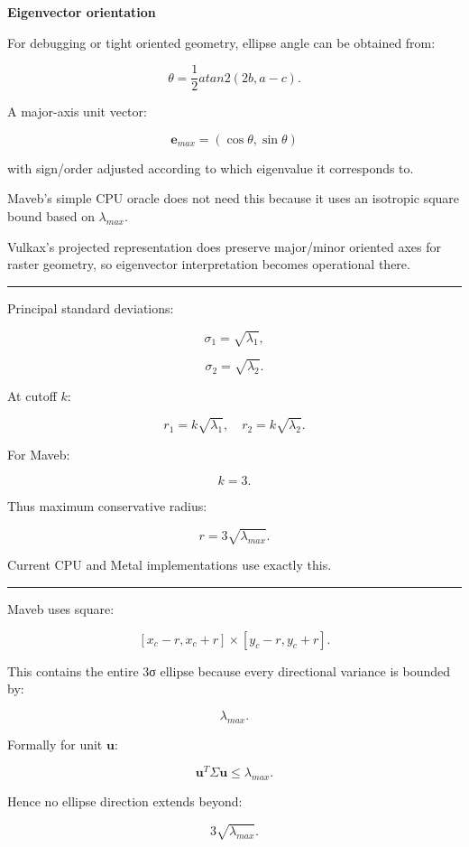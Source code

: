 \textbf{Eigenvector orientation}

For debugging or tight oriented geometry, ellipse angle can be obtained from:

\[
\boxed{
\theta=
\frac12
atan2(
2b,
a-c
).
}
\]

A major-axis unit vector:

\[
\mathbf e_{max}
=
(\cos\theta,\sin\theta)
\]

with sign/order adjusted according to which eigenvalue it corresponds to.

Maveb's simple CPU oracle does not need this because it uses an isotropic square bound based on \(\lambda_{max}\).

Vulkax's projected representation does preserve major/minor oriented axes for raster geometry, so eigenvector interpretation becomes operational there.

\begin{center}\rule{0.5\linewidth}{0.5pt}\end{center}

Principal standard deviations:

\[
\sigma_1=
\sqrt{\lambda_1},
\]

\[
\sigma_2=
\sqrt{\lambda_2}.
\]

At cutoff \(k\):

\[
\boxed{
r_1=
k\sqrt{\lambda_1},
\quad
r_2=
k\sqrt{\lambda_2}.
}
\]

For Maveb:

\[
k=3.
\]

Thus maximum conservative radius:

\[
\boxed{
r=
3\sqrt{\lambda_{max}}.
}
\]

Current CPU and Metal implementations use exactly this.

\begin{center}\rule{0.5\linewidth}{0.5pt}\end{center}

Maveb uses square:

\[
[x_c-r,x_c+r]
\times
[y_c-r,y_c+r].
\]

This contains the entire 3σ ellipse because every directional variance is bounded by:

\[
\lambda_{max}.
\]

Formally for unit \(\mathbf u\):

\[
\mathbf u^T
\Sigma
\mathbf u
\le
\lambda_{max}.
\]

Hence no ellipse direction extends beyond:

\[
3\sqrt{\lambda_{max}}.
\]

